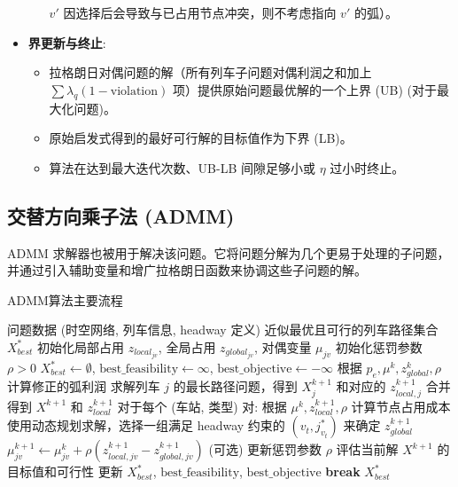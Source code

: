 \documentclass{article}
\begin{document}
\begin{itemize}
\begin{itemize}
                $v'$ 因选择后会导致与已占用节点冲突，则不考虑指向 $v'$ 的弧）。
        \end{itemize}
    \item \textbf{界更新与终止}:
        \begin{itemize}
            \item 拉格朗日对偶问题的解（所有列车子问题对偶利润之和加上 $\sum \lambda_q (1 -
                \text{violation})$ 项）提供原始问题最优解的一个上界 (UB) (对于最大化问题)。
            \item 原始启发式得到的最好可行解的目标值作为下界 (LB)。
            \item 算法在达到最大迭代次数、UB-LB 间隙足够小或 $\eta$ 过小时终止。
        \end{itemize}
\end{itemize}

\subsection{交替方向乘子法 (ADMM)}
ADMM 求解器也被用于解决该问题。它将问题分解为几个更易于处理的子问题，并通过引入辅助变量和增广拉格朗日函数来协调这些子问题的解。

\begin{algorithm}[H]
    \caption{ADMM算法主要流程}
    \begin{algorithmic}[1]
        \Require 问题数据 (时空网络, 列车信息, headway 定义)
        \Ensure 近似最优且可行的列车路径集合 $X_{best}^*$
        \State 初始化局部占用 $z_{local_{jv}}$, 全局占用 $z_{global_{jv}}$, 对偶变量 $\mu_{jv}$
        \State 初始化惩罚参数 $\rho > 0$
        \State $X_{best}^* \gets \emptyset$,
        $\text{best\_feasibility} \gets \infty$,
        $\text{best\_objective} \gets -\infty$
        \State {}
        \State 根据 $p_e, \mu^k, z_{global}^k, \rho$ 计算修正的弧利润
        \State 求解列车 $j$ 的最长路径问题，得到 $X_j^{k+1}$ 和对应的 $z_{local,j}^{k+1}$
        \EndFor
        \State 合并得到 $X^{k+1}$ 和 $z_{local}^{k+1}$
        \State {}
        \State 对于每个 (车站, 类型) 对:
        \State \quad 根据 $\mu^k, z_{local}^{k+1}, \rho$ 计算节点占用成本
        \State \quad 使用动态规划求解，选择一组满足 headway 约束的 $(v_t, j^*_{v_t})$
        来确定 $z_{global}^{k+1}$
        \State {}
        \State $\mu_{jv}^{k+1} \gets \mu_{jv}^k + \rho
        (z_{local,jv}^{k+1} - z_{global,jv}^{k+1})$
        \State (可选) 更新惩罚参数 $\rho$
        \State 评估当前解 $X^{k+1}$ 的目标值和可行性
        \State 更新 $X_{best}^*$, $\text{best\_feasibility}$,
        $\text{best\_objective}$
        \EndIf
        \State \textbf{break}
        \EndIf
        \EndFor
        \State \Return $X_{best}^*$
    \end{algorithmic}
\end{algorithm}
\end{document}
